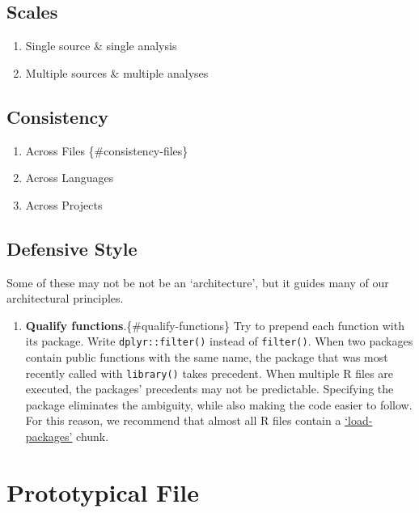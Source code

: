 \documentclass[]{book}
\providecommand{\tightlist}{%
  \setlength{\itemsep}{0pt}\setlength{\parskip}{0pt}}
\begin{document}
\hypertarget{scales}{%
\section{Scales}\label{scales}}

\begin{enumerate}
\def\labelenumi{\arabic{enumi}.}
\tightlist
\item
  Single source \& single analysis
\item
  Multiple sources \& multiple analyses
\end{enumerate}

\hypertarget{consistency}{%
\section{Consistency}\label{consistency}}

\begin{enumerate}
\def\labelenumi{\arabic{enumi}.}
\tightlist
\item
  Across Files \{\#consistency-files\}
\item
  Across Languages
\item
  Across Projects
\end{enumerate}

\hypertarget{defensive-style}{%
\section{Defensive Style}\label{defensive-style}}

Some of these may not be not be an `architecture', but it guides many of our architectural principles.

\begin{enumerate}
\def\labelenumi{\arabic{enumi}.}
\tightlist
\item
  \textbf{Qualify functions}.\{\#qualify-functions\} Try to prepend each function with its package. Write \texttt{dplyr::filter()} instead of \texttt{filter()}. When two packages contain public functions with the same name, the package that was most recently called with \texttt{library()} takes precedent. When multiple R files are executed, the packages' precedents may not be predictable. Specifying the package eliminates the ambiguity, while also making the code easier to follow. For this reason, we recommend that almost all R files contain a \protect\hyperlink{load-packages}{`load-packages'} chunk.
\end{enumerate}

\hypertarget{file-prototype}{%
\chapter{Prototypical File}\label{file-prototype}}
\end{document}
